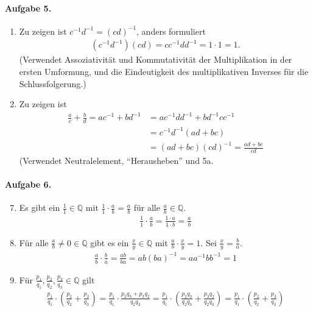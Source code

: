 \documentclass{article}
\begin{document}
\paragraph{Aufgabe 5.}
\begin{enumerate}
    \item Zu zeigen ist $c^{-1}d^{-1} = (cd)^{-1}$, anders formuliert
    \begin{align*}
        (c^{-1}d^{-1})(cd) = cc^{-1}dd^{-1} = 1 \cdot 1 = 1.
    \end{align*}
    (Verwendet Assoziativität und Kommutativität der Multiplikation in der ersten Umformung, und die Eindeutigkeit des multiplikativen Inverses für die Schlussfolgerung.)
    \item Zu zeigen ist
    \begin{align*}
        \frac{a}{c} + \frac{b}{d} = ac^{-1} + bd^{-1} &= ac^{-1}dd^{-1} + bd^{-1}cc^{-1} \\
        &= c^{-1}d^{-1}(ad + bc) \\
        &= (ad + bc)(cd)^{-1} = \frac{ad + bc}{cd}
    \end{align*}
    (Verwendet Neutralelement, \enquote{Herausheben} und 5a.
\end{enumerate}

\paragraph{Aufgabe 6.}
\begin{enumerate}[label=\arabic*)]
    \setcounter{enumi}{6}
    \item Es gibt ein $\frac{1}{1} \in \mathbb{Q}$ mit $\frac{1}{1} \cdot \frac{a}{b} = \frac{a}{b}$ für alle $\frac{a}{b} \in \mathbb{Q}$.
    \begin{align*}
        \frac{1}{1} \cdot \frac{a}{b} = \frac{1 \cdot a}{1 \cdot b} = \frac{a}{b}
    \end{align*}
    \item Für alle $\frac{a}{b} \neq 0 \in \mathbb{Q}$ gibt es ein $\frac{x}{y} \in \mathbb{Q}$ mit $\frac{a}{b} \cdot \frac{x}{y} = 1$. Sei $\frac{x}{y} = \frac{b}{a}$.
    \begin{align*}
        \frac{a}{b} \cdot \frac{b}{a} = \frac{ab}{ba} = ab(ba)^{-1} = aa^{-1}bb^{-1} = 1
    \end{align*}
    \item Für $\frac{p_1}{q_1}, \frac{p_2}{q_2}, \frac{p_3}{q_3} \in \mathbb{Q}$ gilt
    \begin{align*}
        \frac{p_1}{q_1} \cdot \left(\frac{p_2}{q_2} + \frac{p_3}{q_3}\right) = \frac{p_1}{q_1} \cdot \frac{p_2q_3 + p_3q_2}{q_2q_3} = \frac{p_1}{q_1} \cdot \left(\frac{p_2q_3}{q_2q_3} + \frac{p_3q_2}{q_2q_3}\right) = \frac{p_1}{q_1} \cdot \left(\frac{p_2}{q_2} + \frac{p_3}{q_3}\right)
    \end{align*}
\end{enumerate}
\end{document}
